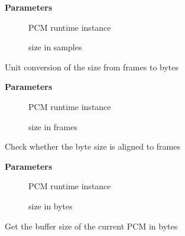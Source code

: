\documentclass[a4paper,8pt,english]{sphinxmanual}
\begin{document}
\textbf{Parameters}
\begin{description}
\item[{}] \leavevmode
PCM runtime instance

\item[{}] \leavevmode
size in samples

\end{description}

\begin{fulllineitems}
\label{sound/kernel-api/alsa-driver-api:c.frames_to_bytes}
Unit conversion of the size from frames to bytes

\end{fulllineitems}


\textbf{Parameters}
\begin{description}
\item[{}] \leavevmode
PCM runtime instance

\item[{}] \leavevmode
size in frames

\end{description}

\begin{fulllineitems}
\label{sound/kernel-api/alsa-driver-api:c.frame_aligned}
Check whether the byte size is aligned to frames

\end{fulllineitems}


\textbf{Parameters}
\begin{description}
\item[{}] \leavevmode
PCM runtime instance

\item[{}] \leavevmode
size in bytes

\end{description}

\begin{fulllineitems}
\label{sound/kernel-api/alsa-driver-api:c.snd_pcm_lib_buffer_bytes}
Get the buffer size of the current PCM in bytes

\end{fulllineitems}
\end{document}
